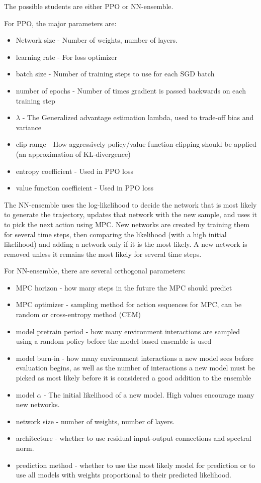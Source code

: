 \documentclass[letterpaper]{article}
\theoremstyle{definition}
\begin{document}
The possible students are either PPO or NN-ensemble.

For PPO, the major parameters are:
\begin{itemize}
	\item Network size - Number of weights, number of layers.
	\item learning rate - For loss optimizer
	\item batch size - Number of training steps to use for each SGD batch
	\item number of epochs - Number of times gradient is passed backwards on each training step
	\item $\lambda$ - The Generalized advantage estimation lambda, used to trade-off bias and variance
	\item clip range - How aggressively policy/value function clipping should be applied (an approximation of KL-divergence)
	\item entropy coefficient - Used in PPO loss
	\item value function coefficient - Used in PPO loss
\end{itemize} 

The NN-ensemble uses the log-likelihood to decide the network that is most likely to generate the trajectory, updates that network with the new sample, and uses it to pick the next action using MPC.
New networks are created by training them for several time steps, then comparing the likelihood (with a high initial likelihood) and adding a network only if it is the most likely.
A new network is removed unless it remains the most likely for several time steps.

For NN-ensemble, there are several orthogonal parameters:
\begin{itemize}
	\item MPC horizon - how many steps in the future the MPC should predict
	\item MPC optimizer - sampling method for action sequences for MPC, can be random or cross-entropy method (CEM)
	\item model pretrain period - how many environment interactions are sampled using a random policy before the model-based ensemble is used
	\item model burn-in - how many environment interactions a new model sees before evaluation begins, as well as the number of interactions a new model must be picked as most likely before it is considered a good addition to the ensemble
	\item model $\alpha$ - The initial likelihood of a new model. High values encourage many new networks.
	\item network size - number of weights, number of layers.
	\item architecture - whether to use residual input-output connections and spectral norm.
	\item prediction method - whether to use the  most likely model for prediction or to use all models with weights proportional to their predicted likelihood.
\end{itemize}
\end{document}
